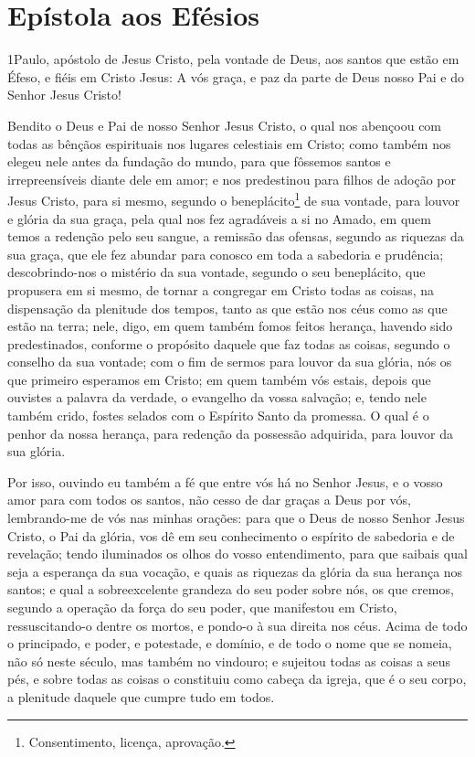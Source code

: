 \thispagestyle{empty}
\chapter*{Epístola aos Efésios}

\lettrine{1} Paulo, apóstolo de Jesus Cristo, pela vontade de
Deus, aos santos que estão em Éfeso, e fiéis em Cristo Jesus: A
vós graça, e paz da parte de Deus nosso Pai e do Senhor Jesus
Cristo!

Bendito o Deus e Pai de nosso Senhor Jesus Cristo, o qual nos
abençoou com todas as bênçãos espirituais nos lugares celestiais em
Cristo; como também nos elegeu nele antes da fundação do mundo,
para que fôssemos santos e irrepreensíveis diante dele em amor;
e nos predestinou para filhos de adoção por Jesus Cristo, para
si mesmo, segundo o beneplácito\footnote{Consentimento, licença,
aprovação.} de sua vontade, para louvor e glória da sua graça,
pela qual nos fez agradáveis a si no Amado, em quem temos a
redenção pelo seu sangue, a remissão das ofensas, segundo as
riquezas da sua graça, que ele fez abundar para conosco em toda
a sabedoria e prudência; descobrindo-nos o mistério da sua
vontade, segundo o seu beneplácito, que propusera em si mesmo,
de tornar a congregar em Cristo todas as coisas, na
dispensação da plenitude dos tempos, tanto as que estão nos céus
como as que estão na terra; nele, digo, em quem também fomos
feitos herança, havendo sido predestinados, conforme o propósito
daquele que faz todas as coisas, segundo o conselho da sua vontade;
com o fim de sermos para louvor da sua glória, nós os que
primeiro esperamos em Cristo; em quem também vós estais,
depois que ouvistes a palavra da verdade, o evangelho da vossa
salvação; e, tendo nele também crido, fostes selados com o Espírito
Santo da promessa. O qual é o penhor da nossa herança, para
redenção da possessão adquirida, para louvor da sua glória.

Por isso, ouvindo eu também a fé que entre vós há no Senhor
Jesus, e o vosso amor para com todos os santos, não cesso de
dar graças a Deus por vós, lembrando-me de vós nas minhas orações:
para que o Deus de nosso Senhor Jesus Cristo, o Pai da
glória, vos dê em seu conhecimento o espírito de sabedoria e de
revelação; tendo iluminados os olhos do vosso entendimento,
para que saibais qual seja a esperança da sua vocação, e quais as
riquezas da glória da sua herança nos santos; e qual a
sobreexcelente grandeza do seu poder sobre nós, os que cremos,
segundo a operação da força do seu poder, que manifestou em
Cristo, ressuscitando-o dentre os mortos, e pondo-o à sua direita
nos céus. Acima de todo o principado, e poder, e potestade, e
domínio, e de todo o nome que se nomeia, não só neste século, mas
também no vindouro; e sujeitou todas as coisas a seus pés, e
sobre todas as coisas o constituiu como cabeça da igreja, que
é o seu corpo, a plenitude daquele que cumpre tudo em todos.

